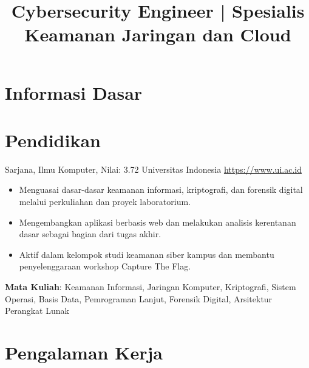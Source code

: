 \documentclass[a4paper, serif, 10pt]{moderncv}
\title{Cybersecurity Engineer | Spesialis Keamanan Jaringan dan Cloud}
\begin{document}
\maketitle

\section{Informasi Dasar}

\section{Pendidikan}

        {Sarjana, Ilmu Komputer, Nilai: 3.72}
        {Universitas Indonesia}
        {\url{https://www.ui.ac.id}}
        {}
        {\begin{itemize}
\item Menguasai dasar-dasar keamanan informasi, kriptografi, dan forensik digital melalui perkuliahan dan proyek laboratorium.
\item Mengembangkan aplikasi berbasis web dan melakukan analisis kerentanan dasar sebagai bagian dari tugas akhir.
\item Aktif dalam kelompok studi keamanan siber kampus dan membantu penyelenggaraan workshop Capture The Flag.
\end{itemize}
\textbf{Mata Kuliah}: Keamanan Informasi, Jaringan Komputer, Kriptografi, Sistem Operasi, Basis Data, Pemrograman Lanjut, Forensik Digital, Arsitektur Perangkat Lunak}
\section{Pengalaman Kerja}
\end{document}
